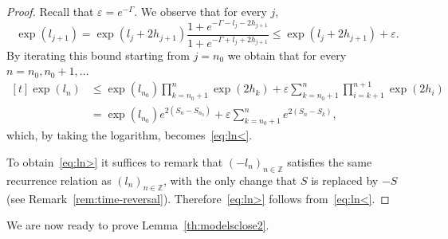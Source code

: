 \documentclass[10pt]{amsart}
\theoremstyle{definition}\newtheorem{defi}[theo]{Definition}\newtheorem{rema}[theo]{Remark}\newtheorem{exam}[theo]{Example}\newtheorem{exem}[theo]{Example}\newtheorem{nota}[theo]{Notation}
\newcommand{\bbZ}{\mathbb{Z}}
\newcommand{\gep}{\varepsilon}
\newcommand{\gG}{\Gamma}
\begin{document}
\begin{proof}
Recall that $\gep= e^{-\gG}$. We observe that for every $j$,
\begin{equation}
\exp \left(l_{j+1}\right)
= \exp \left(l_{j} + 2h_{j+1}\right) \frac{1+ e^{-\gG -l_j-2h_{j+1}}}{1+ e^{-\gG +l_j+2h_{j+1}}}
\le \exp \left(l_{j}+ 2h_{j+1}\right)+ \gep.
\end{equation}
By iterating this bound starting from $j=n_0$ we obtain that for every $n=n_0, n_0+1, \dots$
\begin{equation}
\begin{aligned}[t]
\exp \left(l_{n}\right) &\le \exp \left(l_{n_0}\right)\prod_{k={n_0}+1}^{n} \exp(2h_k) +\gep \sum_{k={n_0}+1}^{n} \prod_{i=k+1}^{n+1} \exp(2h_i)
\\ &=  \exp \left(l_{n_0}\right) e^{2\left(S_{n}-S_{n_0}\right)}+\gep \sum_{k={n_0}+1}^{n} e^{2(S_{n}-S_k)},
\end{aligned}
\end{equation}
which, by taking the logarithm, becomes~\eqref{eq:ln<}.


To obtain~\eqref{eq:ln>} it suffices to remark that $(-l_n)_{n\in\bbZ}$ satisfies the same recurrence relation as $(l_n)_{n\in\bbZ}$, with the only change that $S$ is replaced by $-S$ (see Remark~\ref{rem:time-reversal}). Therefore~\eqref{eq:ln>} follows from~\eqref{eq:ln<}.
\end{proof}


We are now ready to prove Lemma~\ref{th:modelsclose2}.
\end{document}
